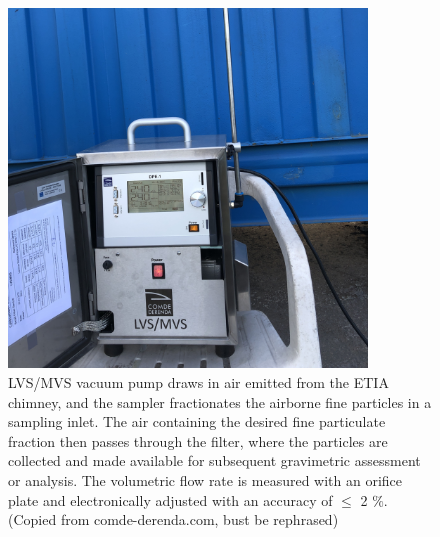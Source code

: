 \begin{figure}
    \centering
    \includegraphics[width=0.85\textwidth]{Bilder/Pyrolysis/ParticlePump.jpg}
    \caption{LVS/MVS vacuum pump draws in air emitted from the ETIA chimney, and the sampler fractionates the airborne fine particles in a sampling inlet. The air containing the desired fine particulate fraction then passes through the filter, where the particles are collected and made available for subsequent gravimetric assessment or analysis. The volumetric flow rate is measured with an orifice plate and electronically adjusted with an accuracy of $\leq$ 2 $\%$. (Copied from comde-derenda.com, bust be rephrased)}
    \label{appFig:ParticlePump}
\end{figure}